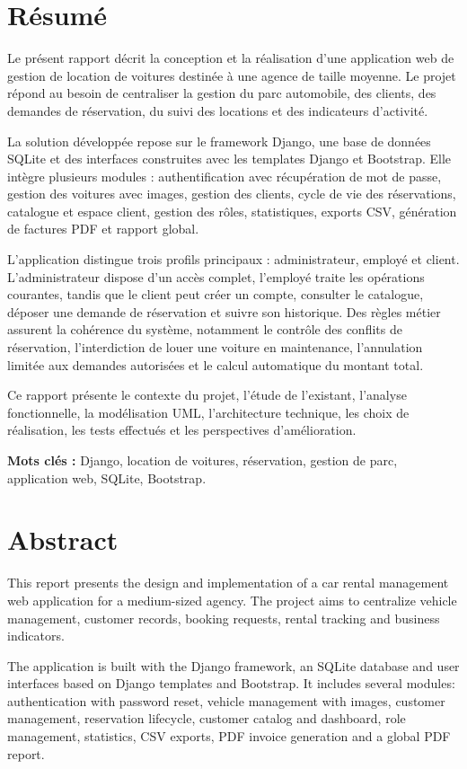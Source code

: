 \chapter*{Résumé}
Le présent rapport décrit la conception et la réalisation d'une application web de gestion de location de voitures destinée à une agence de taille moyenne. Le projet répond au besoin de centraliser la gestion du parc automobile, des clients, des demandes de réservation, du suivi des locations et des indicateurs d'activité.

La solution développée repose sur le framework Django, une base de données SQLite et des interfaces construites avec les templates Django et Bootstrap. Elle intègre plusieurs modules : authentification avec récupération de mot de passe, gestion des voitures avec images, gestion des clients, cycle de vie des réservations, catalogue et espace client, gestion des rôles, statistiques, exports CSV, génération de factures PDF et rapport global.

L'application distingue trois profils principaux : administrateur, employé et client. L'administrateur dispose d'un accès complet, l'employé traite les opérations courantes, tandis que le client peut créer un compte, consulter le catalogue, déposer une demande de réservation et suivre son historique. Des règles métier assurent la cohérence du système, notamment le contrôle des conflits de réservation, l'interdiction de louer une voiture en maintenance, l'annulation limitée aux demandes autorisées et le calcul automatique du montant total.

Ce rapport présente le contexte du projet, l'étude de l'existant, l'analyse fonctionnelle, la modélisation UML, l'architecture technique, les choix de réalisation, les tests effectués et les perspectives d'amélioration.

\textbf{Mots clés :} Django, location de voitures, réservation, gestion de parc, application web, SQLite, Bootstrap.

\clearpage
\chapter*{Abstract}
This report presents the design and implementation of a car rental management web application for a medium-sized agency. The project aims to centralize vehicle management, customer records, booking requests, rental tracking and business indicators.

The application is built with the Django framework, an SQLite database and user interfaces based on Django templates and Bootstrap. It includes several modules: authentication with password reset, vehicle management with images, customer management, reservation lifecycle, customer catalog and dashboard, role management, statistics, CSV exports, PDF invoice generation and a global PDF report.

